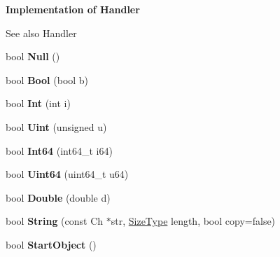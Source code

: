 \begin{Indent}{\bf Implementation of Handler}\par
{\em \begin{DoxySeeAlso}{See also}
Handler 
\end{DoxySeeAlso}
}\begin{DoxyCompactItemize}
\item 
bool {\bfseries Null} ()\hypertarget{class_pretty_writer_acbcab646050e5e9204ab2b13c798092b}{}\label{class_pretty_writer_acbcab646050e5e9204ab2b13c798092b}

\item 
bool {\bfseries Bool} (bool b)\hypertarget{class_pretty_writer_afddf1586eeba72bc4fbb0e1346ced9b9}{}\label{class_pretty_writer_afddf1586eeba72bc4fbb0e1346ced9b9}

\item 
bool {\bfseries Int} (int i)\hypertarget{class_pretty_writer_a14da2a84e9f41ba42edf2819363be614}{}\label{class_pretty_writer_a14da2a84e9f41ba42edf2819363be614}

\item 
bool {\bfseries Uint} (unsigned u)\hypertarget{class_pretty_writer_a65227d9de9a9f92eb3ca83c616a9c809}{}\label{class_pretty_writer_a65227d9de9a9f92eb3ca83c616a9c809}

\item 
bool {\bfseries Int64} (int64\+\_\+t i64)\hypertarget{class_pretty_writer_a2ce0d71e221d72b8cf17d2b60ae610af}{}\label{class_pretty_writer_a2ce0d71e221d72b8cf17d2b60ae610af}

\item 
bool {\bfseries Uint64} (uint64\+\_\+t u64)\hypertarget{class_pretty_writer_a888229dc2e5a15b2fd577b47e86a17b3}{}\label{class_pretty_writer_a888229dc2e5a15b2fd577b47e86a17b3}

\item 
bool {\bfseries Double} (double d)\hypertarget{class_pretty_writer_a20ffcf3ada1be664719f44cec76711ed}{}\label{class_pretty_writer_a20ffcf3ada1be664719f44cec76711ed}

\item 
bool {\bfseries String} (const Ch $\ast$str, \hyperlink{rapidjson_8h_a5ed6e6e67250fadbd041127e6386dcb5}{Size\+Type} length, bool copy=false)\hypertarget{class_pretty_writer_ae6cec4b69e86cff3121451f29e4862ef}{}\label{class_pretty_writer_ae6cec4b69e86cff3121451f29e4862ef}

\item 
bool {\bfseries Start\+Object} ()\hypertarget{class_pretty_writer_a445e063722149f86bf1a0cd7b8892f07}{}\label{class_pretty_writer_a445e063722149f86bf1a0cd7b8892f07}


\end{DoxyCompactItemize}
\end{Indent}
